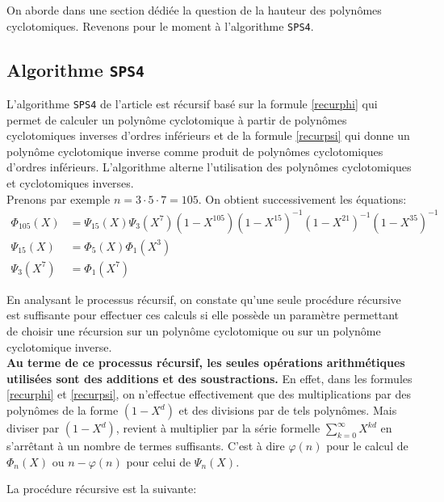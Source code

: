\documentclass{article}
\newcounter{question}
\theoremstyle{break}                  %
\begin{document}
On aborde dans une section dédiée la question de la hauteur des polynômes cyclotomiques. Revenons pour le moment à l'algorithme \texttt{SPS4}.

\subsection*{Algorithme \texttt{SPS4}}
L'algorithme \texttt{SPS4} de l'article est récursif basé sur la formule \ref{recurphi} qui permet de calculer un polynôme cyclotomique à partir de polynômes cyclotomiques inverses d'ordres inférieurs et de la formule \ref{recurpsi} qui donne un polynôme cyclotomique inverse comme produit de polynômes cyclotomiques d'ordres inférieurs. L'algorithme alterne l'utilisation des polynômes cyclotomiques et cyclotomiques inverses.\\

Prenons par exemple $n = 3 \cdot 5 \cdot 7 = 105$. On obtient successivement les équations:
\begin{align*}
	\Phi_{105}(X) &= \Psi_{15}(X)\Psi_{3}(X^7)(1-X^{105})(1-X^{15})^{-1}(1-X^{21})^{-1}(1-X^{35})^{-1}\\
	\Psi_{15}(X) &= \Phi_{5}(X) \Phi_{1}(X^3)\\
	\Psi_{3}(X^7) &= \Phi_{1}(X^7) 
\end{align*}

En analysant le processus récursif, on constate qu'une seule procédure récursive est suffisante pour effectuer ces calculs si elle possède un paramètre permettant de choisir une récursion sur un polynôme cyclotomique ou sur un polynôme cyclotomique inverse.\\

\textbf{Au terme de ce processus récursif, les seules opérations arithmétiques utilisées sont des additions et des soustractions.} En effet, dans les formules \ref{recurphi} et \ref{recurpsi}, on n'effectue effectivement que des multiplications par des polynômes de la forme $(1-X^d)$ et des divisions par de tels polynômes. Mais diviser par $(1-X^d)$, revient à multiplier par la série formelle $\displaystyle \sum_{k = 0}^\infty X^{kd}$ en s'arrêtant à un nombre de termes suffisants. C'est à dire $\varphi(n)$ pour le calcul de $\Phi_n(X)$ ou $n - \varphi(n)$ pour celui de $\Psi_n(X)$.\\


\par La procédure récursive est la suivante:
\end{document}
